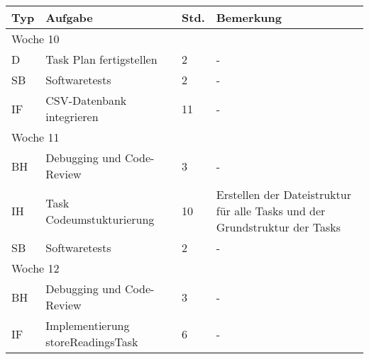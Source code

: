 \vspace{1em}
\begin{table}[!hp]
    \begin{center}
        \begin{tabular}{|p{0.8cm}|p{6cm}|p{0.8cm}|p{8cm}|} \hline
            \textbf{Typ} & \textbf{Aufgabe}                    & \textbf{Std.} & \textbf{Bemerkung}                                                         \\ \hline
            \multicolumn{4}{|l|}{Woche 10}                                                                                                                  \\ \hline
            D            & Task Plan fertigstellen             & 2             & -                                                                          \\
            SB           & Softwaretests                       & 2             & -                                                                          \\
            IF           & CSV-Datenbank integrieren           & 11            & -                                                                          \\ \hline
            \multicolumn{4}{|l|}{Woche 11}                                                                                                                  \\ \hline
            BH           & Debugging und Code-Review           & 3             & -                                                                          \\
            IH           & Task Codeumstukturierung            & 10            & Erstellen der Dateistruktur für alle Tasks und der Grundstruktur der Tasks \\
            SB           & Softwaretests                       & 2             & -                                                                          \\ \hline
            \multicolumn{4}{|l|}{Woche 12}                                                                                                                  \\ \hline
            BH           & Debugging und Code-Review           & 3             & -                                                                          \\
            IF           & Implementierung storeReadings\-Task & 6             & -                                                                          \\ \hline

\end{tabular}
\end{center}
\end{table}
